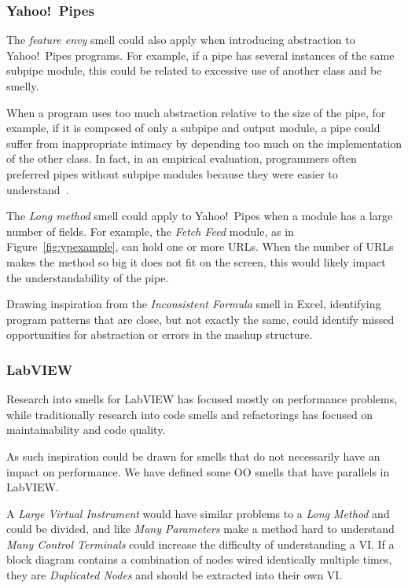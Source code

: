 \documentclass[10pt,conference,compsocconf]{IEEEtran}
\begin{document}
\subsubsection{Yahoo!\ Pipes}
\label{sec:smells:future:yp}
The \emph{feature envy} smell could also apply when introducing abstraction to Yahoo!\ Pipes programs. For example, if a pipe has several instances of the same subpipe module, this could be related to excessive use of another class and be smelly. 

When a program uses too much abstraction relative to the size of the pipe, for example, if it is composed of only a subpipe and output module, a pipe could suffer from inappropriate intimacy by depending too much on the implementation of the other class. In fact, in an empirical evaluation, programmers often preferred pipes without subpipe modules because they were easier to understand~\cite{StoleeTSE2013}. 

The \emph{Long method} smell could apply to Yahoo!\ Pipes when a module has a large number of fields. For example, the \emph{Fetch Feed} module, as in Figure~\ref{fig:ypexample}, can hold one or more URLs. When the number of URLs makes the method so big it does not fit on the screen, this would likely impact the understandability of the pipe. 

Drawing inspiration from the \emph{Inconsistent Formula} smell in Excel, identifying program patterns that are close, but not exactly the same, could identify missed opportunities for abstraction or errors in the mashup structure. 

\subsubsection{LabVIEW}

Research into smells for LabVIEW has focused mostly on performance problems, while traditionally research into code smells and refactorings has focused on maintainability and code quality.

As such inspiration could be drawn for smells that do not necessarily have an impact on performance.
We have defined some OO smells that have parallels in LabVIEW.

A \emph{Large Virtual Instrument} would have similar problems to a \emph{Long Method} and could be divided, and like \emph{Many Parameters} make a method hard to understand \emph{Many Control Terminals} could increase the difficulty of understanding a VI.
If a block diagram contains a combination of nodes wired identically multiple times, they are \emph{Duplicated Nodes} and should be extracted into their own VI. 
\end{document}

